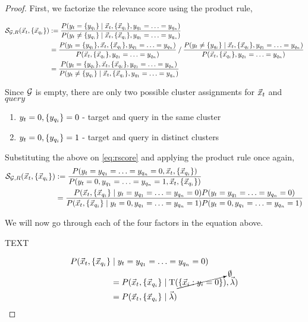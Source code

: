 \documentclass{article}
\newcommand{\set}[1]{\{{#1}\}}
\theoremstyle{break}
\begin{document}
    \begin{proof}
      First, we factorize the relevance score using the product rule,
     
      \begin{align}
        \label{eq:rscore}
        \rscore (\target, \queryset) &:= \frac 
            {P(\yt = \yqset \mid \target, \queryset, \sameyq)}
            {P(\yt \neq \yqset \mid \target, \queryset, \sameyq)} \\
        &= \frac {P(\yt = \yqset, \target, \queryset, \sameyq)}
            {P(\target, \queryset, \sameyq)} \mathbin{/}
            \frac {P(\yt \neq \yqset \mid \target, \queryset, \sameyq)}
            {P(\target, \queryset, \sameyq)} \\
        &= \frac {P(\yt = \yqset, \target, \queryset, \sameyq)}
            {P(\yt \neq \yqset \mid \target, \queryset, \sameyq)}\\
      \end{align}
      
      Since $\mathcal{G}$ is empty, there are only two possible cluster assignments for
      $\vec x_t$ and $query$

      \begin{enumerate}
      \item $\yt=0, \yqset = 0$ - target and query in the same cluster
      \item $\yt=0, \yqset = 1$ - target and query in distinct clusters
      \end{enumerate}

      Substituting the above on \eqref{eq:rscore} and applying the product rule
      once again,
      \begin{align}
        \rscore (\target, \queryset) &:= \frac 
            {P(\yt = \sameyq = 0, \target, \queryset)}
            {P(\yt = 0, \sameyq = 1, \target, \queryset)}\\
        &= \frac{P(\target, \queryset \mid \yt = \sameyq = 0) 
            P(\yt = \sameyq = 0)}
            {P(\target, \queryset \mid \yt = 0, \sameyq = 1)
            P(\yt = 0, \sameyq = 1)}
      \end{align}

      We will now go through each of the four factors in the equation above. 

      TEXT

      \begin{align}
        P(\target, \queryset &\mid \yt = \sameyq = 0) \\
        & = P(\target, \queryset \mid 
            \sstats(\cancelto{\emptyset}{\set{\vec x_i: y_i=0}}), \hypers) \\
        & = P(\target, \queryset \mid \hypers)
      \end{align}


\end{proof}
\end{document}
